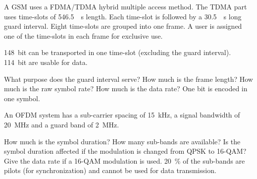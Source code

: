 \begin{question}[subtitle={2G cell phone -- GSM}]
	A GSM uses a FDMA/TDMA hybrid multiple access method. The TDMA part uses time-slots of \SI{546.5}{\micro{}s} length. Each time-slot is followed by a \SI{30.5}{\micro{}s} long guard interval. Eight time-slots are grouped into one frame. A user is assigned one of the time-slots in each frame for exclusive use.
	
	\SI{148}{bit} can be transported in one time-slot (excluding the guard interval). \SI{114}{bit} are usable for data.
		
	\begin{tasks}
		\task
		What purpose does the guard interval serve?
		\task
		How much is the frame length?
		\task
		How much is the raw symbol rate?
		\task
		How much is the data rate? One bit is encoded in one symbol.
	\end{tasks}
\end{question}

\begin{solution}
	\begin{tasks}
	\end{tasks}
\end{solution}

\begin{question}[subtitle={OFDM}]
	An OFDM system has a sub-carrier spacing of \SI{15}{kHz}, a signal bandwidth of \SI{20}{MHz} and a guard band of \SI{2}{MHz}.
	
	\begin{tasks}
		\task
		How much is the symbol duration?
		\task
		How many sub-bands are available?
		\task
		Is the symbol duration affected if the modulation is changed from QPSK to 16-QAM?
		\task
		Give the data rate if a 16-QAM modulation is used. \SI{20}{\percent} of the sub-bands are pilots (for synchronization) and cannot be used for data transmission.
	\end{tasks}
\end{question}

\begin{solution}
	\begin{tasks}
	\end{tasks}
\end{solution}

